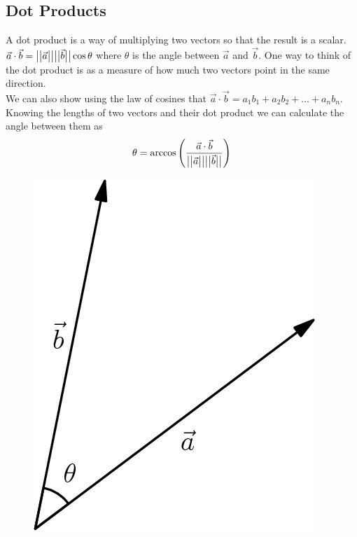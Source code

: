 \subsection{Dot Products}
\noindent
A dot product is a way of multiplying two vectors so that the result is a scalar. $\vec{a}\cdot\vec{b} = \big\lvert \big\lvert \vec{a} \big\rvert \big\rvert\big\lvert \big\lvert \vec{b} \big\rvert \big\rvert\cos{\theta}$ where $\theta$ is the angle between $\vec{a}$ and $\vec{b}$. One way to think of the dot product is as a measure of how much two vectors point in the same direction.\\
We can also show using the law of cosines that $\vec{a}\cdot\vec{b} = a_1b_1+a_2b_2+...+a_nb_n$.\\
Knowing the lengths of two vectors and their dot product we can calculate the angle between them as
\begin{equation*}
	\theta = \arccos{\left(\frac{\vec{a} \cdot \vec{b}}{\big\lvert \big\lvert \vec{a} \big\rvert \big\rvert \big\lvert \big\lvert \vec{b} \big\rvert \big\rvert}\right)}
\end{equation*}

\begin{figure}[H]
	\centering
	\includegraphics[scale=0.33]{Images/backgroundReview/DotProduct}
\end{figure}

